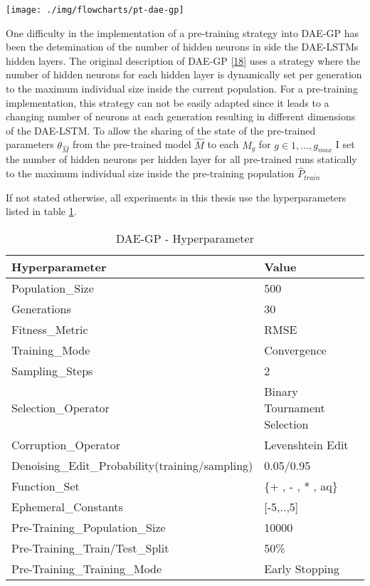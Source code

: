 \documentclass[
  11pt,
]{article}
\let\origfigure\figure
\let\endorigfigure\endfigure
\renewenvironment{figure}[1][2] {
    \expandafter\origfigure\expandafter[H]
} {
    \endorigfigure
}
\begin{document}
\begin{figure}[c]

{\centering \texttt{[image: ./img/flowcharts/pt-dae-gp]} 

}

\caption{Pre-Trained DAE-GP Flowchart}\label{fig:pt-daegp-flowchart}
\end{figure}

One difficulty in the implementation of a pre-training strategy into DAE-GP has been the detemination of the number of hidden neurons in side the DAE-LSTMs hidden layers. The original description of DAE-GP {[}\protect\hyperlink{ref-dae-gp_2020_rtree}{18}{]} uses a strategy where the number of hidden neurons for each hidden layer is dynamically set per generation to the maximum individual size inside the current population.
For a pre-training implementation, this strategy can not be easily adapted since it leads to a changing number of neurons at each generation resulting in different dimensions of the DAE-LSTM. To allow the sharing of the state of the pre-trained parameters \(\theta_{\hat{M}}\) from the pre-trained model \(\hat{M}\) to each \(M_g\) for \(g\in{1,...,g_{max}}\) I set the number of hidden neurons per hidden layer for all pre-trained runs statically to the maximum individual size inside the pre-training population \(\hat{P}_{train}\)

If not stated otherwise, all experiments in this thesis use the hyperparameters listed in table \ref{tab:airfoil-fullRun-2hl-maxIndSize-params}.

\begin{table}

\caption{\label{tab:airfoil-fullRun-2hl-maxIndSize-params}DAE-GP - Hyperparameter}
\centering
\begin{tabular}[t]{l|l}
\hline
\textbf{Hyperparameter} & \textbf{Value}\\
\hline
Population\_Size & 500\\
\hline
Generations & 30\\
\hline
Fitness\_Metric & RMSE\\
\hline
Training\_Mode & Convergence\\
\hline
Sampling\_Steps & 2\\
\hline
Selection\_Operator & Binary Tournament Selection\\
\hline
Corruption\_Operator & Levenshtein Edit\\
\hline
Denoising\_Edit\_Probability(training/sampling) & 0.05/0.95\\
\hline
Function\_Set & \{+ , - , * , aq\}\\
\hline
Ephemeral\_Constants & [-5,..,5]\\
\hline
Pre-Training\_Population\_Size & 10000\\
\hline
Pre-Training\_Train/Test\_Split & 50\%\\
\hline
Pre-Training\_Training\_Mode & Early Stopping\\
\hline
\end{tabular}
\end{table}
\end{document}

